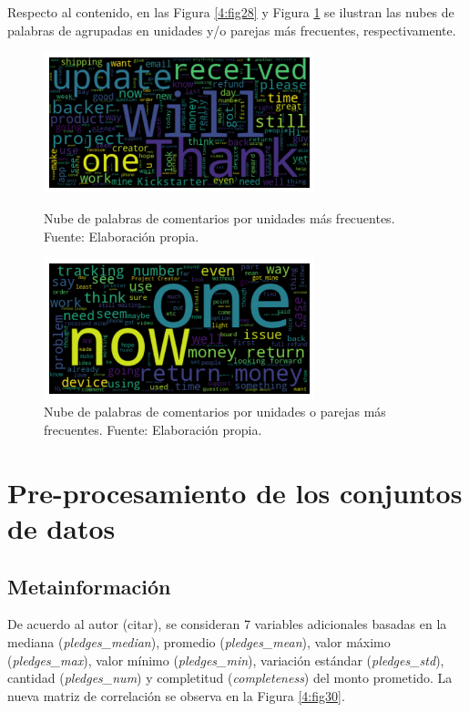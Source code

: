 Respecto al contenido, en las Figura \ref{4:fig28} y Figura \ref{4:fig29} se ilustran las nubes de palabras de agrupadas en unidades y/o parejas más frecuentes, respectivamente.

\begin{figure}[htbp]
	\begin{center}
		\includegraphics[width=0.70\textwidth]{4/figures/comments_wordcloud_wordunit.png}
		\caption{Nube de palabras de comentarios por unidades más frecuentes. Fuente: Elaboración propia.}
		\label{4:fig28}
		
		\includegraphics[width=0.70\textwidth]{4/figures/comments_wordcloud_wordcouple.png}
		\caption{Nube de palabras de comentarios por unidades o parejas más frecuentes. Fuente: Elaboración propia.}
		\label{4:fig29}
	\end{center}
\end{figure}

\section{Pre-procesamiento de los conjuntos de datos}

\subsection{Metainformación}
De acuerdo al autor (citar), se consideran 7 variables adicionales basadas en la mediana (\textit{pledges\_median}), promedio (\textit{pledges\_mean}), valor máximo (\textit{pledges\_max}), valor mínimo (\textit{pledges\_min}), variación estándar (\textit{pledges\_std}), cantidad (\textit{pledges\_num}) y completitud (\textit{completeness}) del monto prometido. La nueva matriz de correlación se observa en la Figura \ref{4:fig30}.


